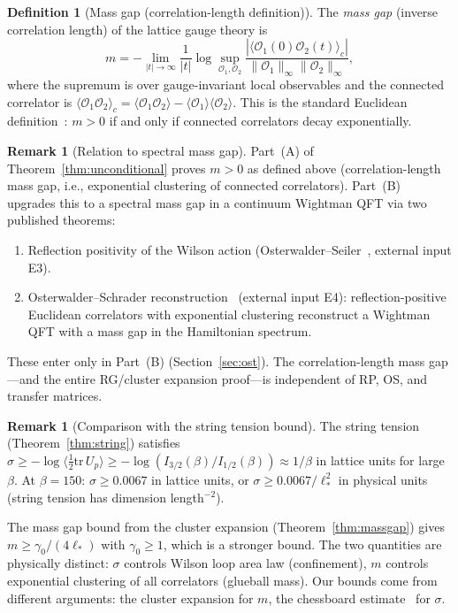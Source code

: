 \documentclass[11pt]{article}
\theoremstyle{definition}
\newtheorem{definition}[theorem]{Definition}
\newtheorem{remark}[theorem]{Remark}
\newcommand{\tr}{\mathrm{tr}}
\begin{document}
\begin{definition}[Mass gap (correlation-length definition)]%
\label{def:massgap}
The \emph{mass gap} (inverse correlation length) of the lattice
gauge theory is
\begin{equation}
m=-\lim_{|t|\to\infty}\frac{1}{|t|}
\log\sup_{\mathcal{O}_1,\mathcal{O}_2}
\frac{|\langle\mathcal{O}_1(0)\mathcal{O}_2(t)\rangle_c|}
{\|\mathcal{O}_1\|_\infty\|\mathcal{O}_2\|_\infty},
\end{equation}
where the supremum is over gauge-invariant local observables
and the connected correlator is
$\langle\mathcal{O}_1\mathcal{O}_2\rangle_c
=\langle\mathcal{O}_1\mathcal{O}_2\rangle
-\langle\mathcal{O}_1\rangle\langle\mathcal{O}_2\rangle$.
This is the standard Euclidean definition~\cite{JaffeWitten}:
$m>0$ if and only if connected correlators decay
exponentially.
\end{definition}

\begin{remark}[Relation to spectral mass gap]%
\label{rem:OS-reconstruction}
Part~(A) of Theorem~\ref{thm:unconditional} proves $m>0$ as defined
above (correlation-length mass gap, i.e., exponential clustering
of connected correlators).  Part~(B) upgrades this to a spectral
mass gap in a continuum Wightman QFT via two published theorems:
\begin{enumerate}[nosep]
\item Reflection positivity of the Wilson action
(Osterwalder--Seiler~\cite{OS78}, external input E3).
\item Osterwalder--Schrader reconstruction~\cite{OS73}
(external input E4):
reflection-positive Euclidean correlators with exponential
clustering reconstruct a Wightman QFT with a mass gap in
the Hamiltonian spectrum.
\end{enumerate}
These enter only in Part~(B) (Section~\ref{sec:ost}).  The
correlation-length mass gap---and the entire RG/cluster
expansion proof---is independent of RP, OS, and transfer matrices.
\end{remark}

\begin{remark}[Comparison with the string tension bound]%
\label{rem:string-vs-gap}
The string tension (Theorem~\ref{thm:string}) satisfies
$\sigma\ge-\log\langle\frac{1}{2}\tr\,U_p\rangle
\ge-\log(I_{3/2}(\beta)/I_{1/2}(\beta))
\approx 1/\beta$ in lattice units for large $\beta$.
At $\beta=150$: $\sigma\ge 0.0067$ in lattice units, or
$\sigma\ge 0.0067/\ell_*^2$ in physical units (string tension
has dimension length$^{-2}$).

The mass gap bound from the cluster expansion
(Theorem~\ref{thm:massgap}) gives
$m\ge\gamma_0/(4\ell_*)$ with $\gamma_0\ge 1$, which is a
stronger bound.  The two quantities are physically distinct:
$\sigma$ controls Wilson loop area law (confinement),
$m$ controls exponential clustering of all correlators
(glueball mass).  Our bounds come from different arguments:
the cluster expansion for $m$, the chessboard
estimate~\cite[Theorem~6.1]{Seiler82} for $\sigma$.
\end{remark}
\end{document}
